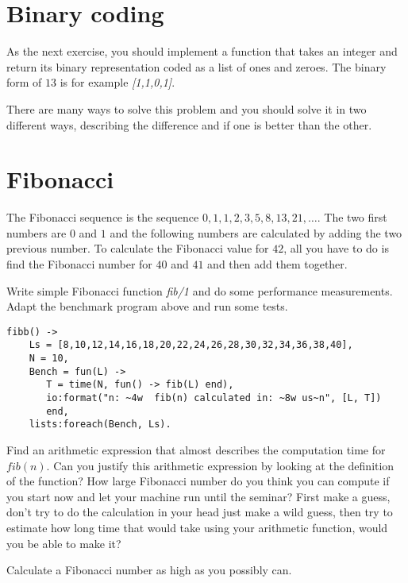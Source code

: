 \documentclass[a4paper,11pt]{article}
\begin{document}
\section{Binary coding}

As the next exercise, you should implement a function that takes an
integer and return its binary representation coded as a list of ones
and zeroes. The binary form of $13$ is for example {\em [1,1,0,1]}. 

There are many ways to solve this problem and you should solve it in
two different ways, describing the difference and if one is better
than the other.


\section{Fibonacci}

The Fibonacci sequence is the sequence $0,1,1,2,3,5,8,13,21,
\ldots$. The two first numbers are $0$ and $1$ and the following
numbers are calculated by adding the two previous number. To calculate
the Fibonacci value for $42$, all you have to do is find the Fibonacci
number for $40$ and $41$ and then add them together.

Write simple Fibonacci function {\em fib/1} and do some performance
measurements. Adapt the benchmark program above and run some tests.

\begin{verbatim}
fibb() ->
    Ls = [8,10,12,14,16,18,20,22,24,26,28,30,32,34,36,38,40],
    N = 10,
    Bench = fun(L) ->
       T = time(N, fun() -> fib(L) end),
       io:format("n: ~4w  fib(n) calculated in: ~8w us~n", [L, T])
       end,
    lists:foreach(Bench, Ls).
\end{verbatim}

Find an arithmetic expression that almost describes the computation
time for $fib(n)$. Can you justify this arithmetic expression by
looking at the definition of the function?  How large Fibonacci number
do you think you can compute if you start now and let your machine run
until the seminar? First make a guess, don't try to do the calculation
in your head just make a wild guess, then try to estimate how long
time that would take using your arithmetic function, would you be able
to make it? 

Calculate a Fibonacci number as high as you possibly can.
\end{document}
